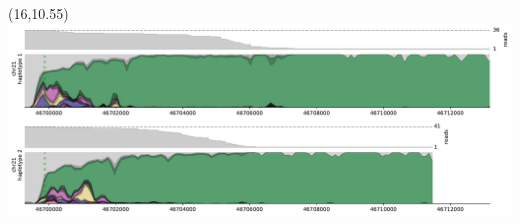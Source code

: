 \documentclass{article}
\begin{document}
\begin{textblock}{11}(16,10.55)  \includegraphics[width=11in]{main-figure-assets/densityplots/chr21-haps.pdf}                    \end{textblock}
\end{document}
